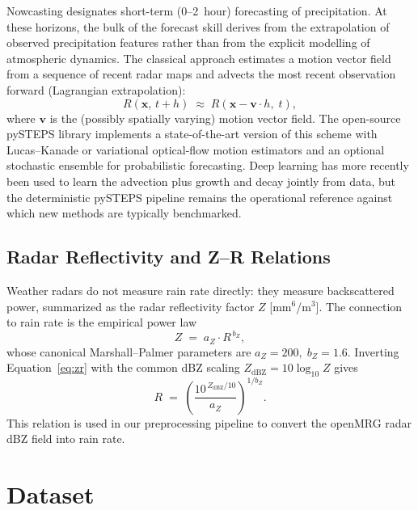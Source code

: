 \documentclass[12pt, a4paper]{article}
\begin{document}
Nowcasting designates short-term (0--2~hour) forecasting of precipitation.
At these horizons, the bulk of the forecast skill derives from the
extrapolation of observed precipitation features rather than from the
explicit modelling of atmospheric dynamics. The classical approach
estimates a motion vector field from a sequence of recent radar maps
and advects the most recent observation forward (Lagrangian
extrapolation):
\begin{equation}
  R(\mathbf{x},\, t+h) \;\approx\; R(\mathbf{x} - \mathbf{v}\cdot h,\; t), \label{eq:advection}
\end{equation}
where \(\mathbf{v}\) is the (possibly spatially varying) motion vector
field. The open-source pySTEPS library \cite{pulkkinen2019pysteps}
implements a state-of-the-art version of this scheme with
Lucas--Kanade or variational optical-flow motion estimators and an
optional stochastic ensemble for probabilistic forecasting. Deep
learning has more recently been used to learn the advection plus growth
and decay jointly from data, but the deterministic pySTEPS pipeline
remains the operational reference against which new methods are
typically benchmarked.

\subsection{Radar Reflectivity and Z--R Relations}

Weather radars do not measure rain rate directly: they measure
backscattered power, summarized as the radar reflectivity factor
\(Z\) [mm\(^6\)/m\(^3\)]. The connection to rain rate is the empirical
power law
\begin{equation}
  Z \;=\; a_Z \cdot R^{\,b_Z}, \label{eq:zr}
\end{equation}
whose canonical Marshall--Palmer parameters \cite{marshallpalmer1948}
are \(a_Z=200,\; b_Z=1.6\). Inverting Equation~\eqref{eq:zr} with the
common dBZ scaling \(Z_{\text{dBZ}}=10\log_{10}Z\) gives
\begin{equation}
  R \;=\; \left(\frac{10^{\,Z_{\text{dBZ}}/10}}{a_Z}\right)^{1/b_Z}. \label{eq:zr_inv}
\end{equation}
This relation is used in our preprocessing pipeline to convert the
openMRG radar dBZ field into rain rate.

\section{Dataset}\label{sec:dataset}
\end{document}
